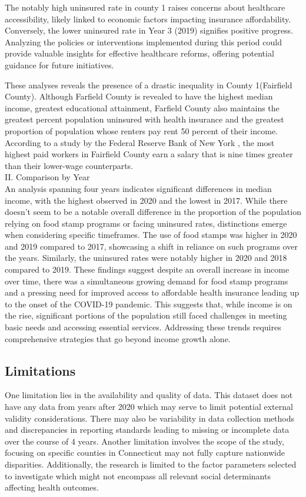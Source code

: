 \documentclass[12pt]{article}
\begin{document}
The notably high uninsured rate in county 1 raises concerns about healthcare accessibility, likely 
linked to economic factors impacting insurance affordability. Conversely, the lower uninsured rate in 
Year 3 (2019) signifies positive progress. Analyzing the policies or interventions implemented during 
this period could provide valuable insights for effective healthcare reforms, offering potential guidance 
for future initiatives.

These analyses reveals the presence of a drastic inequality in County 1(Fairfield County). Although Farfield County
is revealed to have the highest median income, greatest educational attainment, Farfield County also maintains the greatest 
percent population uninsured with health insurance and the greatest proportion of population whose renters pay rent 
50 percent of their income. According to a study by the Federal Reserve Bank of New York 
\citep{Liberty_Street_Economics_2021}, the most highest paid 
workers in Fairfield County earn a salary that is nine times greater than their lower-wage counterparts. 
\\
II. Comparison by Year
\\
An analysis spanning four years indicates significant differences in median income, with the highest observed 
in 2020 and the lowest in 2017. While there doesn't seem to be a notable overall difference in the proportion 
of the population relying on food stamp programs or facing uninsured rates, distinctions emerge when considering 
specific timeframes. The use of food stamps was higher in 2020 and 2019 compared to 2017, showcasing a 
shift in reliance on such programs over the years. Similarly, the uninsured rates were notably higher in 2020 and 
2018 compared to 2019. These findings suggest despite an overall increase in income over time, there was a simultaneous 
growing demand for food stamp programs and a pressing need for improved access to affordable health insurance leading up to the onset 
of the COVID-19 pandemic. 
This suggests that, while income is on the rise, significant portions of the population still faced challenges in
 meeting basic needs and accessing essential services. Addressing these trends requires comprehensive strategies 
 that go beyond income growth alone.


\subsection{Limitations}
One limitation lies in the availability and quality of data. This dataset does not have any 
data from years after 2020 which may serve to limit potential external validity considerations. 
There may also be variability in data collection methods and discrepancies in reporting standards 
leading to missing or incomplete data over the course of 4 years. Another limitation involves the scope 
of the study, focusing on specific counties in Connecticut may not fully capture nationwide disparities. 
Additionally, the research is limited to the factor parameters selected to investigate which  might not 
encompass all relevant social determinants affecting health outcomes.
\end{document}
